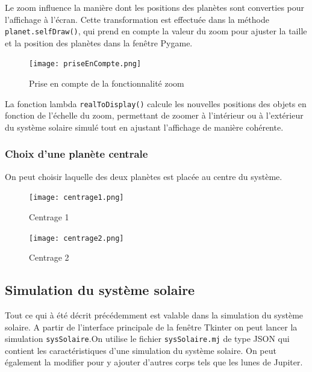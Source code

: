 \documentclass[a4paper, 12pt]{article}
\begin{document}
Le zoom influence la manière dont les positions des planètes sont converties pour l'affichage à l'écran. Cette transformation est effectuée dans la méthode \texttt{planet.selfDraw()}, qui prend en compte la valeur du zoom pour ajuster la taille et la position des planètes dans la fenêtre Pygame.

	\begin{figure}[H]
		\centering
		\texttt{[image: priseEnCompte.png]}
		\caption{\label{fig: priseEnCompte} Prise en compte de la fonctionnalité zoom}  
	\end{figure}
	
La fonction lambda \texttt{realToDisplay()} calcule les nouvelles positions des objets en fonction de l'échelle du zoom, permettant de zoomer à l'intérieur ou à l'extérieur du système solaire simulé tout en ajustant l'affichage de manière cohérente. 

\subsubsection{Choix d'une planète centrale}
On peut choisir laquelle des deux planètes est placée au centre du système.

	\begin{figure}[H]
    	\centering
    	\begin{minipage}{0.27\linewidth}
        	\centering
        	\texttt{[image: centrage1.png]}
        	\caption{\label{fig:centrage1} Centrage 1}
    	\end{minipage}
    	\hspace{0.05\linewidth}  %
    	\begin{minipage}{0.27\linewidth}
        	\centering
        	\texttt{[image: centrage2.png]}
        	\caption{\label{fig:centrage2} Centrage 2} 
    	\end{minipage}
	\end{figure} 


\subsection{Simulation du système solaire}
Tout ce qui à été décrit précédemment est valable dans la simulation du système solaire.
A partir de l'interface principale de la fenêtre Tkinter on peut lancer la simulation \texttt{sysSolaire}.On utilise le fichier \texttt{sysSolaire.mj} de type JSON qui contient les caractéristiques d'une simulation du système solaire. On peut également la modifier pour y ajouter d'autres corps tels que les lunes de Jupiter.
\end{document}
